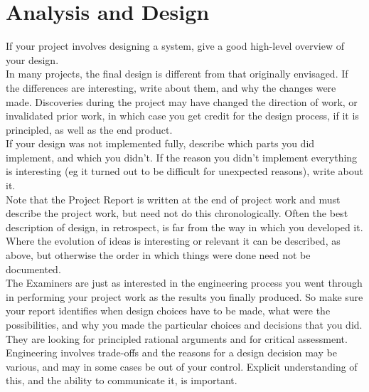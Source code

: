 \section{Analysis and Design}
If your project involves designing a system, give a
good high-level overview of your design.\\ \newline \noindent In many projects, the final design is different from
that originally envisaged. If the differences are
interesting, write about them, and why the changes
were made. Discoveries during the project may have changed the direction of work, or invalidated prior
work, in which case you get credit for the design
process, if it is principled, as well as the end product.\\ \newline \noindent If your design was not implemented fully, describe
which parts you did implement, and which you didn't.
If the reason you didn't implement everything is
interesting (eg it turned out to be difficult for
unexpected reasons), write about it.\\ \newline \noindent Note that the Project Report is written at the end of
project work and must describe the project work, but
need not do this chronologically. Often the best
description of design, in retrospect, is far from the
way in which you developed it. Where the evolution
of ideas is interesting or relevant it can be described,
as above, but otherwise the order in which things
were done need not be documented.\\ \newline \noindent The Examiners are just as interested in the
engineering process you went through in performing
your project work as the results you finally produced.
So make sure your report identifies when design
choices have to be made, what were the possibilities,
and why you made the particular choices and
decisions that you did. They are looking for principled
rational arguments and for critical assessment.
Engineering involves trade-offs and the reasons for a
design decision may be various, and may in some
cases be out of your control. Explicit understanding of
this, and the ability to communicate it, is important.
